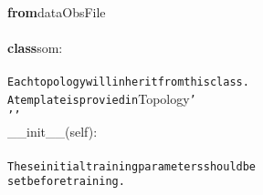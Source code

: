 {{\begin{tabbing}
{\textbf{from}}\hspace{6pt}data\hspace{6pt}ObsFile\\
\\
{\textbf{class}}\hspace{6pt}som:\\
\\
{\texttt{\hspace{48pt}Each\hspace{6pt}topology\hspace{6pt}will\hspace{6pt}inherit\hspace{6pt}from\hspace{6pt}this\hspace{6pt}class.}}\\
{\texttt{\hspace{48pt}A\hspace{6pt}template\hspace{6pt}is\hspace{6pt}provied\hspace{6pt}in\hspace{6pt}{'}}}Topology{\texttt{{'}}}\\
{\texttt{\hspace{24pt}{'}}}{\texttt{{'}{'}}}\\
\hspace{6pt}\_\_init\_\_(self):\\
\\
{\texttt{\hspace{48pt}These\hspace{6pt}initial\hspace{6pt}training\hspace{6pt}parameters\hspace{6pt}should\hspace{6pt}be}}\\
{\texttt{\hspace{48pt}set\hspace{6pt}before\hspace{6pt}training.}}\\

\end{tabbing}}}

